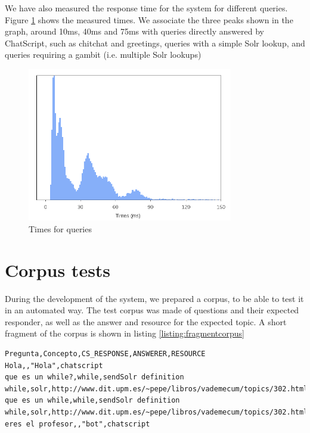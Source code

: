 We have also measured the response time for the system for different queries. Figure \ref{fig:times-demos} shows the measured times. We associate the three peaks shown in the graph, around 10ms, 40ms and 75ms with queries directly answered by ChatScript, such as chitchat and greetings, queries with a simple Solr lookup, and queries requiring a gambit (i.e. multiple Solr lookups)

\begin{figure}[!htbp]
    \centering
    \includegraphics[width=0.8\textwidth]{img/test/times.png}
    \caption{Times for queries}
    \label{fig:times-demos}
\end{figure}

\section{Corpus tests}

During the development of the system, we prepared a corpus, to be able to test it in an automated way. The test corpus was made of questions and their expected responder, as well as the answer and resource for the expected topic. A short fragment of the corpus is shown in listing \ref{listing:fragmentcorpus}

\begin{center} 
  \begin{lstlisting}[language={}, captionpos=b, caption=Fragment of the test corpus built for the system. label=listing:fragmentcorpus]   
Pregunta,Concepto,CS_RESPONSE,ANSWERER,RESOURCE
Hola,,"Hola",chatscript
que es un while?,while,sendSolr definition while,solr,http://www.dit.upm.es/~pepe/libros/vademecum/topics/302.html
que es un while,while,sendSolr definition while,solr,http://www.dit.upm.es/~pepe/libros/vademecum/topics/302.html
eres el profesor,,"bot",chatscript
  \end{lstlisting}
\end{center}

